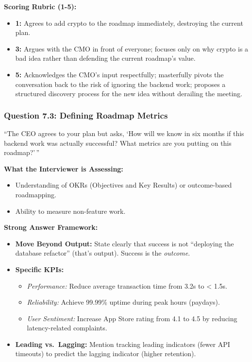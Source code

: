 \textbf{Scoring Rubric (1-5):}

\begin{itemize}
\tightlist
\item
  \textbf{1:} Agrees to add crypto to the roadmap immediately,
  destroying the current plan.
\item
  \textbf{3:} Argues with the CMO in front of everyone; focuses only on
  why crypto is a bad idea rather than defending the current roadmap's
  value.
\item
  \textbf{5:} Acknowledges the CMO's input respectfully; masterfully
  pivots the conversation back to the risk of ignoring the backend work;
  proposes a structured discovery process for the new idea without
  derailing the meeting.
\end{itemize}

\subsubsection{Question 7.3: Defining Roadmap
Metrics}\label{question-7.3-defining-roadmap-metrics}

``The CEO agrees to your plan but asks, `How will we know in six months
if this backend work was actually successful? What metrics are you
putting on this roadmap?'\,''

\textbf{What the Interviewer is Assessing:}

\begin{itemize}
\tightlist
\item
  Understanding of OKRs (Objectives and Key Results) or outcome-based
  roadmapping.
\item
  Ability to measure non-feature work.
\end{itemize}

\textbf{Strong Answer Framework:}

\begin{itemize}
\tightlist
\item
  \textbf{Move Beyond Output:} State clearly that success is not
  ``deploying the database refactor'' (that's output). Success is the
  \emph{outcome}.
\item
  \textbf{Specific KPIs:}

  \begin{itemize}
  \tightlist
  \item
    \emph{Performance:} Reduce average transaction time from 3.2s to
    \textless{} 1.5s.
  \item
    \emph{Reliability:} Achieve 99.99\% uptime during peak hours
    (paydays).
  \item
    \emph{User Sentiment:} Increase App Store rating from 4.1 to 4.5 by
    reducing latency-related complaints.
  \end{itemize}
\item
  \textbf{Leading vs.~Lagging:} Mention tracking leading indicators
  (fewer API timeouts) to predict the lagging indicator (higher
  retention).
\end{itemize}

